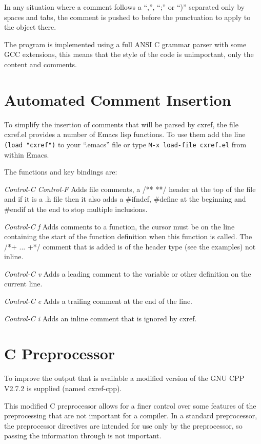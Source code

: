 \documentclass{report}
\begin{document}
In any situation where a comment follows a ``,'', ``;'' or ``)'' separated only by
spaces and tabs, the comment is pushed to before the punctuation to apply to
the object there.

The program is implemented using a full ANSI C grammar parser with some GCC
extensions, this means that the style of the code is unimportant, only the
content and comments.

\section{Automated Comment Insertion}

To simplify the insertion of comments that will be parsed by cxref, the file
cxref.el provides a number of Emacs lisp functions.  To use them add the line
{\tt (load "cxref")} to your ``.emacs'' file or type {\tt M-x load-file cxref.el} from
within Emacs.

The functions and key bindings are:
\begin{list}{}{\leftmargin=1.3in }
\item[{\it Control-C Control-F}]
Adds file comments, a /** **/ header at the top of the
file and if it is a .h file then it also adds a \#ifndef,
\#define at the beginning and \#endif at the end to stop
multiple inclusions.
\item[{\it Control-C f}]
Adds comments to a function, the cursor must be on the
line containing the start of the function definition when
this function is called.  The /*+ ... +*/ comment that is
added is of the header type (see the examples) not inline.
\item[{\it Control-C v}]
Adds a leading comment to the variable or other definition
on the current line.
\item[{\it Control-C e}]
Adds a trailing comment at the end of the line.
\item[{\it Control-C i}]
Adds an inline comment that is ignored by cxref.
\end{list}

\section{C Preprocessor}

To improve the output that is available a modified version of the GNU CPP V2.7.2
is supplied (named cxref-cpp).

This modified C preprocessor allows for a finer control over some features of
the preprocessing that are not important for a compiler.  In a standard
preprocessor, the preprocessor directives are intended for use only by the
preprocessor, so passing the information through is not important.
\end{document}
